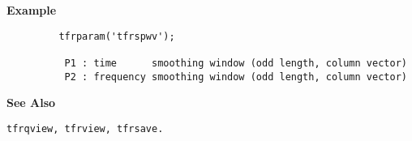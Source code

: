 {\bf \large {}\selectfont Example}
\begin{verbatim}
         tfrparam('tfrspwv');
 
          P1 : time      smoothing window (odd length, column vector)
          P2 : frequency smoothing window (odd length, column vector)
\end{verbatim}
\vspace*{.5cm}

{\bf \large {}\selectfont See Also}\\
\hspace*{1.5cm}
\begin{minipage}[t]{13.5cm}
\begin{verbatim}
tfrqview, tfrview, tfrsave.
\end{verbatim}
\end{minipage}

